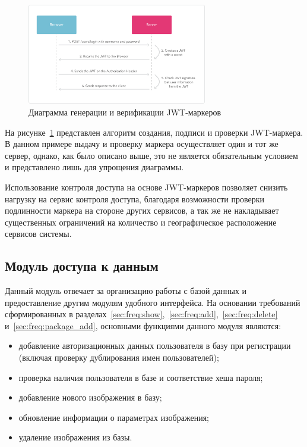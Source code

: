 \begin{figure}[ht]
    \centering
    \includegraphics[width=0.7\textwidth]{figures/jwt_diagram.png}
    \caption{Диаграмма генерации и верификации JWT-маркеров}
    \label{fig:architecture:jwt_diagram}
\end{figure}

На рисунке~\ref{fig:architecture:jwt_diagram} представлен алгоритм создания, подписи и проверки JWT-маркера. В данном примере выдачу и проверку маркера осуществляет один и тот же сервер, однако, как было описано выше, это не является обязательным условием и представлено лишь для упрощения диаграммы.

Использование контроля доступа на основе JWT-маркеров позволяет снизить нагрузку на сервис контроля доступа, благодаря возможности проверки подлинности маркера на стороне других сервисов, а так же не накладывает существенных ограничений на количество и географическое расположение сервисов системы.

\subsection{Модуль доступа к данным}
Данный модуль отвечает за организацию работы с базой данных и предоставление другим модулям удобного интерфейса.
На основании требований сформированных в разделах~\ref{sec:freq:show},~\ref{sec:freq:add},~\ref{sec:freq:delete} и~\ref{sec:freq:package_add}, основными функциями данного модуля являются:
\begin{itemize}
  \item добавление авторизационных данных пользователя в базу при регистрации (включая проверку дублирования имен пользователей);
  \item проверка наличия пользователя в базе и соответствие хеша пароля;
  \item добавление нового изображения в базу;
  \item обновление информации о параметрах изображения;
  \item удаление изображения из базы.
\end{itemize}

